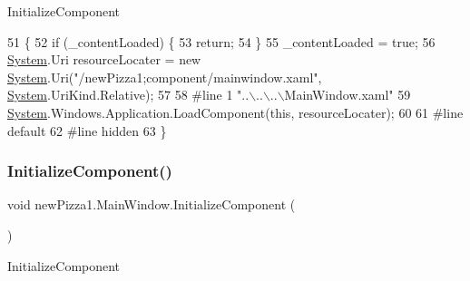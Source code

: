 Initialize\+Component 


\begin{DoxyCode}
51                                           \{
52             \textcolor{keywordflow}{if} (\_contentLoaded) \{
53                 \textcolor{keywordflow}{return};
54             \}
55             \_contentLoaded = \textcolor{keyword}{true};
56             \hyperlink{namespaceSystem}{System}.Uri resourceLocater = \textcolor{keyword}{new} \hyperlink{namespaceSystem}{System}.Uri(\textcolor{stringliteral}{"/newPizza1;component/mainwindow.xaml"},
       \hyperlink{namespaceSystem}{System}.UriKind.Relative);
57             
58 \textcolor{preprocessor}{            #line 1 "..\(\backslash\)..\(\backslash\)..\(\backslash\)MainWindow.xaml"}
59             \hyperlink{namespaceSystem}{System}.Windows.Application.LoadComponent(\textcolor{keyword}{this}, resourceLocater);
60             
61 \textcolor{preprocessor}{            #line default}
62 \textcolor{preprocessor}{            #line hidden}
63         \}
\end{DoxyCode}
\mbox{\label{classnewPizza1_1_1MainWindow_abfa6d086ad6fa95a25da1f69351890ba}} 
\subsubsection{\texorpdfstring{Initialize\+Component()}{InitializeComponent()}\hspace{0.1cm}{\footnotesize\ttfamily [2/3]}}
{\footnotesize\ttfamily void new\+Pizza1.\+Main\+Window.\+Initialize\+Component (\begin{DoxyParamCaption}{ }\end{DoxyParamCaption})\hspace{0.3cm}{\ttfamily [inline]}}



Initialize\+Component 



